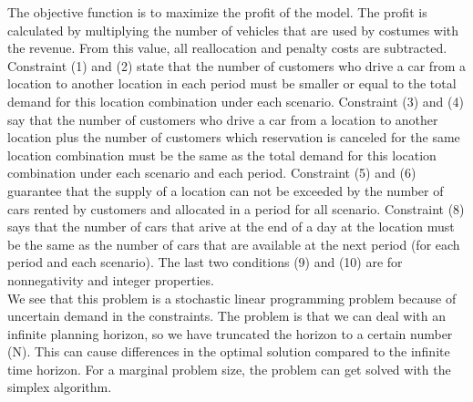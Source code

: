 The objective function is to maximize the profit of the model. The profit is calculated by multiplying the number of vehicles that are used by costumes with the revenue. From this value, all reallocation and penalty costs are subtracted. Constraint (1) and (2) state that the number of customers who drive a car from a location to another location in each period must be smaller or equal to the total demand for this location combination under each scenario. Constraint (3) and (4) say that the number of customers who drive a car from a location to another location plus the number of customers which reservation is canceled for the same location combination must be the same as the total demand for this location combination under each scenario and each period. Constraint (5) and (6) guarantee that the supply of a location can not be exceeded by the number of cars rented by customers and allocated in a period for all scenario. Constraint (8) says that the number of cars that arive at the end of a day at the location must be the same as the number of cars that are available at the next period (for each period and each scenario). The last two conditions (9) and (10) are for nonnegativity and integer properties.\\
We see that this problem is a stochastic linear programming problem because of uncertain demand in the constraints. The problem is that we can deal with an infinite planning horizon, so we have truncated the horizon to a certain number (N). This can cause differences in the optimal solution compared to the infinite time horizon. For a marginal problem size, the problem can get solved with the simplex algorithm.